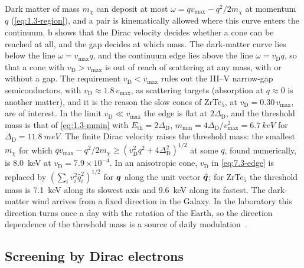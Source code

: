 Dark matter of mass $m_\chi$ can deposit at most $\omega = qv_{\mathrm{max}} - q^2/2m_\chi$ at momentum $q$ (\cref{eq:1.3-region}), and a pair is kinematically allowed where this curve enters the continuum. b shows that the Dirac velocity decides whether a cone can be reached at all, and the gap decides at which mass. The dark-matter curve lies below the line $\omega = v_{\mathrm{max}}q$, and the continuum edge lies above the line $\omega = v_{\mathrm{D}}q$, so that a cone with $v_{\mathrm{D}} > v_{\mathrm{max}}$ is out of reach of scattering at any mass, with or without a gap. The requirement $v_{\mathrm{D}} < v_{\mathrm{max}}$ rules out the III--V narrow-gap semiconductors, with $v_{\mathrm{D}} \approx 1.8\,v_{\mathrm{max}}$, as scattering targets (absorption at $q \approx 0$ is another matter), and it is the reason the slow cones of ZrTe$_5$, at $v_{\mathrm{D}} = 0.30\,v_{\mathrm{max}}$, are of interest. In the limit $v_{\mathrm{D}} \ll v_{\mathrm{max}}$ the edge is flat at $2\Delta_{\mathrm{D}}$, and the threshold mass is that of \cref{eq:1.3-mmin} with $E_{\mathrm{th}} = 2\Delta_{\mathrm{D}}$, $m_{\mathrm{min}} = 4\Delta_{\mathrm{D}}/v_{\mathrm{max}}^2 = \SI{6.7}{keV}$ for $\Delta_{\mathrm{D}} = \SI{11.8}{meV}$. The finite Dirac velocity raises the threshold mass: the smallest $m_\chi$ for which $qv_{\mathrm{max}} - q^2/2m_\chi \ge (v_{\mathrm{D}}^2q^2 + 4\Delta_{\mathrm{D}}^2)^{1/2}$ at some $q$, found numerically, is \SI{8.0}{keV} at $v_{\mathrm{D}} = 7.9\times10^{-4}$. In an anisotropic cone, $v_{\mathrm{D}}$ in \cref{eq:7.3-edge} is replaced by $(\sum_iv_i^2\hat q_i^2)^{1/2}$ for $\bm{q}$ along the unit vector $\hat{\bm{q}}$; for ZrTe$_5$ the threshold mass is \SI{7.1}{keV} along its slowest axis and \SI{9.6}{keV} along its fastest. The dark-matter wind arrives from a fixed direction in the Galaxy. In the laboratory this direction turns once a day with the rotation of the Earth, so the direction dependence of the threshold mass is a source of daily modulation~\cite{geilhufe2020dirac}.

\subsection{Screening by Dirac electrons}

